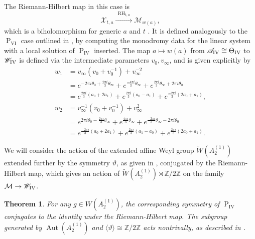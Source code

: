\documentclass[a4paper,reqno]{amsart}
\numberwithin{equation}{section}
\newcommand{\Z}{\mathbb{Z}}
\newcommand{\pain}[1]{\operatorname{P}_{\mathrm{#1}}}
\DeclareMathOperator{\Aut}{Aut}
\newtheorem{theorem}{Theorem}[section]
\numberwithin{equation}{section}
\begin{document}
The Riemann-Hilbert map in this case is 
\begin{equation*}
    \mathcal{X}_{t,a} \xrightarrow{~~\operatorname{RH}_{t,a}~~} \mathcal{M}_{w(a)},    
\end{equation*}
which is a biholomorphism for generic $a$ and $t$ \cite{puttop2013piv}. 
It is defined analogously to the $\pain{VI}$ case outlined in ,  by computing the monodromy data for the linear system with a local solution of $\pain{IV}$ inserted.
The map $a\mapsto w(a)$ from $\mathscr{A}_{\rm{IV}}\cong\Theta_{\rm{IV}}$ to $\mathscr{W}_{\rm{IV}}$ is defined via the intermediate parameters $v_0,v_{\infty}$, and is given explicitly by
\begin{equation} \label{eq:wtothetaandrootvarsPIV}
    \begin{aligned}
    w_1 &= v_{\infty}\left(v_0  + v_0^{-1}\right)+ {v_{\infty}^{-2}}\\
    &=e^{-2\pi i \theta_0 + \frac{2 \pi i}{3}\theta _{\infty }}
    +e^{\frac{-4  \pi i}{3}   \theta _{\infty }}
    +e^{ \frac{2 \pi i}{3}   \theta _{\infty } +2 \pi i \theta _0} \\
    &= e^{\frac{2\pi i }{3} \left(a_0+2a_1\right)}
    +e^{\frac{2  \pi i}{3}   \left(a_0- a_1\right)}
    +e^{\frac{-2\pi i}{3}   \left(2a_0 + a_1\right)},\\
    w_2 &= v_{\infty}^{-1}\left(v_0+v_0^{-1}\right)+v_{\infty}^2\\
    &=e^{ 2 \pi i \theta _0-\frac{2 \pi i}{3}\theta _{\infty }}
    +e^{\frac{4\pi i }{3}   \theta _{\infty }}
    +e^{ \frac{-2  \pi i}{3}  \theta _{\infty } - 2 \pi i \theta _0} \\
    &= e^{\frac{-2 \pi i}{3}   \left(a_0+2 a_1\right)}
    +e^{\frac{2\pi i}{3}  \left(a_1- a_0\right)}
    +e^{\frac{2 \pi i}{3}   \left(2a_0+a_1\right)}.
    \end{aligned}
\end{equation}

We will consider the action of the extended affine Weyl group $\widetilde{W}(A_2^{(1)})$ extended further by the symmetry $\vartheta$, as given in , conjugated by the Riemann-Hilbert map, which gives an action of 
$\widetilde{W}(A_2^{(1)})\rtimes \Z/2\Z$
on the family $\mathcal{M} \to \mathscr{W}_{\rm{IV}}$.

 
\begin{theorem} \label{thm:PIVsymmetriesunderRH}
    For any $g\in W(A_2^{(1)})$, the corresponding symmetry of $\pain{IV}$ conjugates to the identity under the Riemann-Hilbert map.
    The subgroup generated by $\Aut(A_2^{(1)})$ and $\langle\vartheta\rangle \cong \Z/2\Z$ acts nontrivally, as described in .
\end{theorem}
\end{document}
